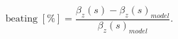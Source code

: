 \begin{equation}
    \mathrm{beating \; [\%]}  = \frac{\beta_z(s) - \beta_z(s)_{model}}{\beta_z(s)_{model}}.
    \label{eq:beam_optics:beating}
\end{equation}


\subsection{}


\subsection{}

